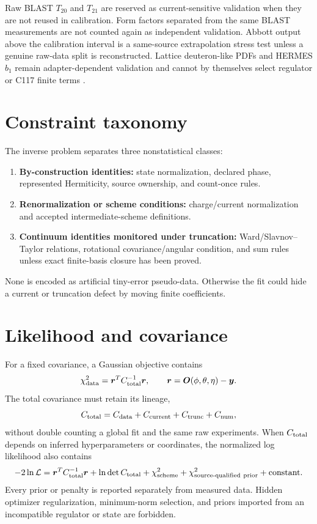 \documentclass[11pt,oneside]{book}
\begin{document}
Raw BLAST $T_{20}$ and $T_{21}$ are reserved as current-sensitive validation when they are not reused in calibration.  Form factors separated from the same BLAST measurements are not counted again as independent validation.  Abbott output above the calibration interval is a same-source extrapolation stress test unless a genuine raw-data split is reconstructed.  Lattice deuteron-like PDFs and HERMES $b_1$ remain adapter-dependent validation and cannot by themselves select regulator or C117 finite terms \cite{ZhangEtAl2011BLAST,HERMES2005b1,DWC400ScienceLock2026}.

\section{Constraint taxonomy}

The inverse problem separates three nonstatistical classes:
\begin{enumerate}[label=(\arabic*)]
 \item \textbf{By-construction identities:} state normalization, declared phase, represented Hermiticity, source ownership, and count-once rules.
 \item \textbf{Renormalization or scheme conditions:} charge/current normalization and accepted intermediate-scheme definitions.
 \item \textbf{Continuum identities monitored under truncation:} Ward/Slavnov--Taylor relations, rotational covariance/angular condition, and sum rules unless exact finite-basis closure has been proved.
\end{enumerate}
None is encoded as artificial tiny-error pseudo-data.  Otherwise the fit could hide a current or truncation defect by moving finite coefficients.

\section{Likelihood and covariance}

For a fixed covariance, a Gaussian objective contains
\begin{equation}
 \chi^2_{\rm data}
 =\bm r^T C_{\rm total}^{-1}\bm r,
 \qquad
 \bm r=\bm O(\phi,\theta,\eta)-\bm y.
 \label{eq:chi-square}
\end{equation}
The total covariance must retain its lineage,
\begin{equation}
 C_{\rm total}
 =C_{\rm data}+C_{\rm current}+C_{\rm trunc}+C_{\rm num},
 \label{eq:total-covariance}
\end{equation}
without double counting a global fit and the same raw experiments.  When $C_{\rm total}$ depends on inferred hyperparameters or coordinates, the normalized log likelihood also contains
\begin{equation}
 -2\ln\mathcal L
 =\bm r^TC_{\rm total}^{-1}\bm r
 +\ln\det C_{\rm total}
 +\chi^2_{\rm scheme}
 +\chi^2_{\rm source\text{-}qualified\ prior}
 +\text{constant}.
 \label{eq:full-likelihood}
\end{equation}
Every prior or penalty is reported separately from measured data.  Hidden optimizer regularization, minimum-norm selection, and priors imported from an incompatible regulator or state are forbidden.
\end{document}
